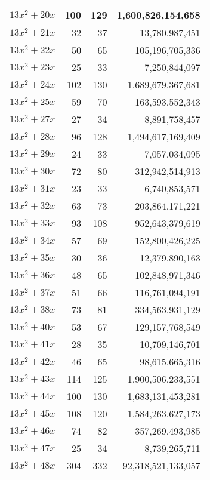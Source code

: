 \documentclass[a4paper]{amsproc}
\theoremstyle{plain}
\begin{document}
\begin{longtable}{ | l | r | r | r | }
$13x^2 + 20x$ & 100 & 129 & 1{,}600{,}826{,}154{,}658 \\ \hline
$13x^2 + 21x$ & 32 & 37 & 13{,}780{,}987{,}451 \\ \hline
$13x^2 + 22x$ & 50 & 65 & 105{,}196{,}705{,}336 \\ \hline
$13x^2 + 23x$ & 25 & 33 & 7{,}250{,}844{,}097 \\ \hline
$13x^2 + 24x$ & 102 & 130 & 1{,}689{,}679{,}367{,}681 \\ \hline
$13x^2 + 25x$ & 59 & 70 & 163{,}593{,}552{,}343 \\ \hline
$13x^2 + 27x$ & 27 & 34 & 8{,}891{,}758{,}457 \\ \hline
$13x^2 + 28x$ & 96 & 128 & 1{,}494{,}617{,}169{,}409 \\ \hline
$13x^2 + 29x$ & 24 & 33 & 7{,}057{,}034{,}095 \\ \hline
$13x^2 + 30x$ & 72 & 80 & 312{,}942{,}514{,}913 \\ \hline
$13x^2 + 31x$ & 23 & 33 & 6{,}740{,}853{,}571 \\ \hline
$13x^2 + 32x$ & 63 & 73 & 203{,}864{,}171{,}221 \\ \hline
$13x^2 + 33x$ & 93 & 108 & 952{,}643{,}379{,}619 \\ \hline
$13x^2 + 34x$ & 57 & 69 & 152{,}800{,}426{,}225 \\ \hline
$13x^2 + 35x$ & 30 & 36 & 12{,}379{,}890{,}163 \\ \hline
$13x^2 + 36x$ & 48 & 65 & 102{,}848{,}971{,}346 \\ \hline
$13x^2 + 37x$ & 51 & 66 & 116{,}761{,}094{,}191 \\ \hline
$13x^2 + 38x$ & 73 & 81 & 334{,}563{,}931{,}129 \\ \hline
$13x^2 + 40x$ & 53 & 67 & 129{,}157{,}768{,}549 \\ \hline
$13x^2 + 41x$ & 28 & 35 & 10{,}709{,}146{,}701 \\ \hline
$13x^2 + 42x$ & 46 & 65 & 98{,}615{,}665{,}316 \\ \hline
$13x^2 + 43x$ & 114 & 125 & 1{,}900{,}506{,}233{,}551 \\ \hline
$13x^2 + 44x$ & 100 & 130 & 1{,}683{,}131{,}453{,}281 \\ \hline
$13x^2 + 45x$ & 108 & 120 & 1{,}584{,}263{,}627{,}173 \\ \hline
$13x^2 + 46x$ & 74 & 82 & 357{,}269{,}493{,}985 \\ \hline
$13x^2 + 47x$ & 25 & 34 & 8{,}739{,}265{,}711 \\ \hline
$13x^2 + 48x$ & 304 & 332 & 92{,}318{,}521{,}133{,}057 \\ \hline

\end{longtable}
\end{document}
